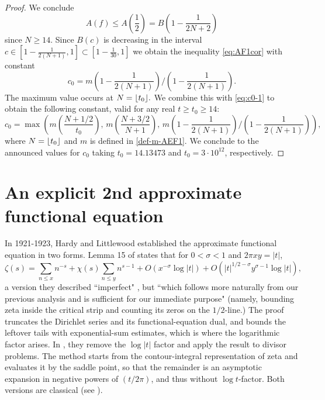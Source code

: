 \documentclass[11pt,letterpaper,oneside,reqno]{amsart}
\DeclarePairedDelimiter\floor{\lfloor}{\rfloor}
\renewcommand{\^}[1]{\widehat{#1}}
\numberwithin{equation}{section}
\theoremstyle{remark}
\begin{document}
\begin{proof}
We conclude
\[
A(f)\leq A\left(\frac{1}{2}\right)=B\left(1-\frac{1}{2N+2}\right)
\]
since $N\geq 14$.
Since $B(c)$ is decreasing in the interval $c\in [1-\frac{1}{2(N+1)},1]\subset [1-\frac{1}{30},1]$ we obtain the inequality \eqref{eq:AF1cor} with constant 
\begin{equation}
    c_0= m \left(1-\frac{1}{2(N+1)}\right)/\left(1-\frac{1}{2(N+1)}\right). %
\end{equation}
%
The maximum value occurs at $N=\floor{t_0}.$ We combine this with \eqref{eq:c0-1} to obtain the following constant, valid for any real $t\ge t_0\ge14$: 
\begin{equation}\label{eq:def-c0}
  c_0=\max\left( m\left(\frac{N+1/2}{t_0}\right), \, 
  m\left(\frac{N+3/2}{N+1}\right), \, 
  m \left(1-\frac{1}{2(N+1)}\right)/\left(1-\frac{1}{2(N+1)}\right)
  \right),  
\end{equation}
where $N=\floor{t_0}$ and $m$ is defined in \eqref{def-m-AEF1}. 
%
We conclude to the announced values for $c_0$ taking $t_0=14.13473$ and $t_0=3\cdot 10^{12}$, respectively.
\end{proof}
%
\section{An explicit 2nd approximate functional equation}\label{section-AFE2}
%
In 1921-1923, Hardy and Littlewood established the approximate functional equation in two forms. 
Lemma 15 of \cite{HL1921} states that for $0 < \sigma < 1$ and $2\pi xy = |t|$,
\begin{equation}
    \zeta(s) = \sum_{n \le x} n^{-s} + \chi(s) \sum_{n \le y} n^{s-1} + O(x^{-\sigma} \log |t|) + O(|t|^{1/2-\sigma} y^{\sigma-1} \log |t|),
\end{equation}
a version they described ``imperfect" , but ``which follows more naturally from our previous analysis and is sufficient for our immediate purpose" (namely, bounding zeta inside the critical strip %
and counting its zeros on the $1/2$-line.)
The proof truncates the Dirichlet series and its functional-equation dual, and bounds the leftover tails with exponential-sum estimates, which is where the logarithmic factor arises. 
In \cite[Theorem A]{HL1923}, they remove the $\log |t|$ factor and apply the result to divisor problems. The method starts from the contour-integral representation of zeta and evaluates it by the saddle point, so that the remainder is an asymptotic expansion in negative powers of $(t/2\pi)$, and thus without $\log t$-factor. 
Both versions are classical (see \cite[Theorem 4.13, Theorem 4.15]{Titchmarsh}). 
\end{document}
